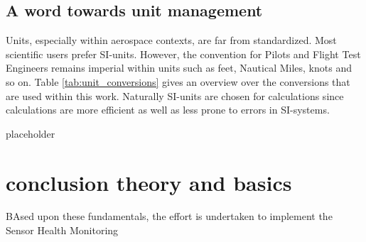 \subsection{A word towards unit management}

Units, especially within aerospace contexts, are far from standardized. Most scientific users prefer SI-units. However, the convention for Pilots and Flight Test Engineers remains imperial within units such as feet, Nautical Miles, knots and so on. Table \ref{tab:unit_conversions} gives an overview over the conversions that are used within this work. Naturally SI-units are chosen for calculations since calculations are more efficient as well as less prone to errors in SI-systems.

\begin{table}
    placeholder
    \label{tab:unit_conversions}
\end{table}




\section{conclusion theory and basics}

BAsed upon these fundamentals, the effort is undertaken to implement the Sensor Health  Monitoring
